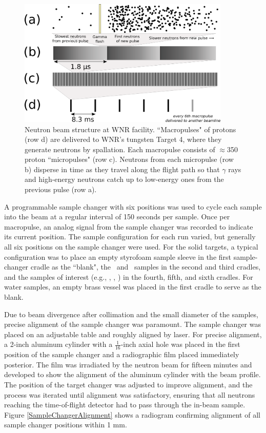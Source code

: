 \begin{figure}[ht!]
    \centering
    \includegraphics[width=0.9\textwidth]{figures/beamStructure.png}
    \caption[Pulsed structure of the neutron beam at the WNR facility]
    {
        Neutron beam structure at WNR facility.
        ``Macropulses" of protons (row d) are delivered to
        WNR's tungsten Target 4, where they generate neutrons by spallation.
        Each macropulse consists of
        $\approx$350 proton ``micropulses" (row c). Neutrons
        from each micropulse (row b) disperse in
        time as they travel along the flight path so that $\gamma$ rays and high-energy 
        neutrons catch up to low-energy ones from the previous pulse (row a).
    }
    \label{BeamStructure}
\end{figure}

A programmable sample changer with six positions
was used to cycle each sample into the beam at a regular interval of 150 seconds 
per sample. Once per macropulse, an analog signal from the sample changer was recorded to 
indicate its current position. The sample configuration for each run varied, but
generally all six positions on the sample changer were used. For the solid targets,
a typical configuration was to place an empty styrofoam sample sleeve in the
first sample-changer cradle as
the ``blank", the \cNat\ and \pbNat\ samples in the second and third
cradles, and the samples of interest (e.g., \niEight, \niNat, \niFour) in
the fourth, fifth, and sixth cradles. For water samples, an empty brass vessel
was placed in the first cradle to serve as the blank.

Due to beam divergence after collimation and the small diameter of the
samples, precise alignment of the sample changer was paramount. The sample
changer was placed on an adjustable table and roughly aligned by laser. For
precise alignment, a 2-inch aluminum cylinder with a
$\frac{1}{16}$-inch axial hole was placed
in the first position of the sample changer and a radiographic film placed
immediately posterior. The film was irradiated by the neutron beam for fifteen 
minutes and developed to show the alignment of the aluminum cylinder with the
beam profile. The position of the target changer was adjusted to improve alignment,
and the process was
iterated until alignment was satisfactory, ensuring that all neutrons
reaching the time-of-flight detector had to pass through the in-beam sample.
Figure \ref{SampleChangerAlignment} shows a radiogram confirming alignment of all
sample changer positions within 1 mm.

